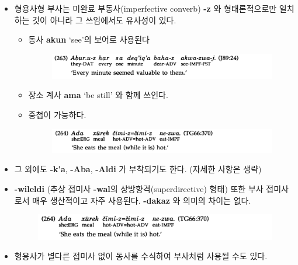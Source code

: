 \begin{itemize}
\begin{figure}[H]
\end{figure}
\item 형용사형 부사는 미완료 부동사(imperfective converb) \textbf{-z} 와 형태론적으로만 일치하는 것이 아니라 그 쓰임에서도 유사성이 있다.
\begin{itemize}
\item 동사 \textbf{akun} `see'의 보어로 사용된다
\begin{figure}[H]
\centerline{\includegraphics[width=.8\linewidth]{Lezgian/src/ex263.png}}
\end{figure}
\item 장소 계사 \textbf{ama} `be still' 와 함께 쓰인다.
\item 중첩이 가능하다.
\begin{figure}[H]
\centerline{\includegraphics[width=.8\linewidth]{Lezgian/src/ex264.png}}
\end{figure}
\end{itemize}
\item 그 외에도 \textbf{-k'a}, \textbf{-Aba}, \textbf{-Aldi} 가 부착되기도 한다. (자세한 사항은 생략)
\item \textbf{-wileldi} (추상 접미사  \textbf{-wal}의 상방향격(superdirective) 형태) 또한 부사 접미사로서 매우 생산적이고 자주 사용된다. \textbf{-dakaz} 와 의미의 차이는 없다.
\begin{figure}[H]
\centerline{\includegraphics[width=.8\linewidth]{Lezgian/src/ex264.png}}
\end{figure}
\item 형용사가 별다른 접미사 없이 동사를 수식하여 부사처럼 사용될 수도 있다.
\end{itemize}

